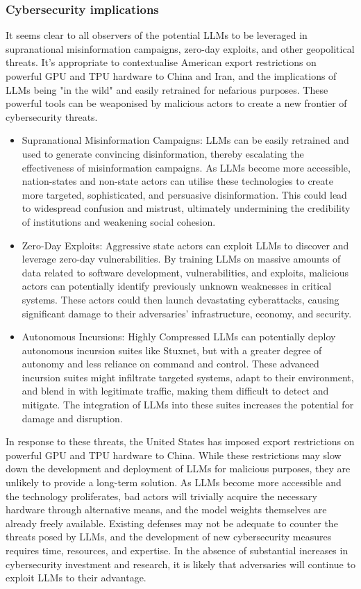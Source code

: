 \subsubsection{Cybersecurity implications}

It seems clear to all observers of the potential LLMs to be leveraged in supranational misinformation campaigns, zero-day exploits, and other geopolitical threats. It's appropriate to contextualise American export restrictions on powerful GPU and TPU hardware to China and Iran, and the implications of LLMs being "in the wild" and easily retrained for nefarious purposes. These powerful tools can be weaponised by malicious actors to create a new frontier of cybersecurity threats. 
\begin{itemize}
\item Supranational Misinformation Campaigns: 
LLMs can be easily retrained and used to generate convincing disinformation, thereby escalating the effectiveness of misinformation campaigns. As LLMs become more accessible, nation-states and non-state actors can utilise these technologies to create more targeted, sophisticated, and persuasive disinformation. This could lead to widespread confusion and mistrust, ultimately undermining the credibility of institutions and weakening social cohesion.
\item Zero-Day Exploits: 
Aggressive state actors can exploit LLMs to discover and leverage zero-day vulnerabilities. By training LLMs on massive amounts of data related to software development, vulnerabilities, and exploits, malicious actors can potentially identify previously unknown weaknesses in critical systems. These actors could then launch devastating cyberattacks, causing significant damage to their adversaries' infrastructure, economy, and security.
\item Autonomous Incursions:  Highly Compressed LLMs can potentially deploy autonomous incursion suites like Stuxnet, but with a greater degree of autonomy and less reliance on command and control. These advanced incursion suites might infiltrate targeted systems, adapt to their environment, and blend in with legitimate traffic, making them difficult to detect and mitigate. The integration of LLMs into these suites increases the potential for damage and disruption.
\end{itemize}
In response to these threats, the United States has imposed export restrictions on powerful GPU and TPU hardware to China. While these restrictions may slow down the development and deployment of LLMs for malicious purposes, they are unlikely to provide a long-term solution. As LLMs become more accessible and the technology proliferates, bad actors will trivially acquire the necessary hardware through alternative means, and the model weights themselves are already freely available. Existing defenses may not be adequate to counter the threats posed by LLMs, and the development of new cybersecurity measures requires time, resources, and expertise. In the absence of substantial increases in cybersecurity investment and research, it is likely that adversaries will continue to exploit LLMs to their advantage.\par
